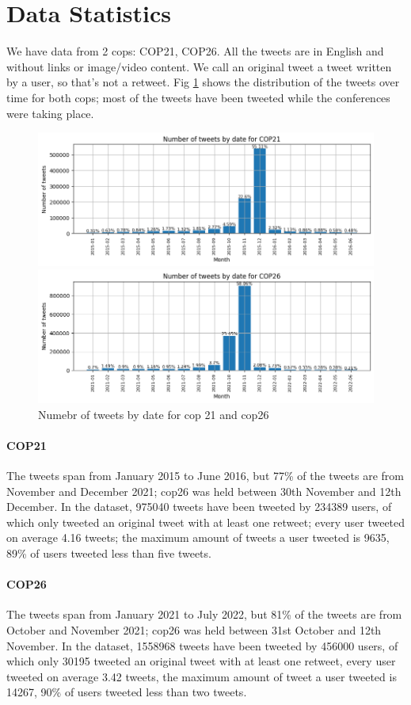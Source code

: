 \section{ Data Statistics}
We have data from 2 cops: COP21, COP26.
All the tweets are in English and without links or image/video content.
We call an original tweet a tweet written by a user, so that's not a retweet. Fig \ref{fig:tweets_by_date} shows the distribution of the tweets over time for both cops; most of the tweets have been tweeted while the conferences were taking place.

\begin{figure}[H]
    \centering
    \includegraphics[width=0.75\linewidth ]{Chapter3/figures/tweets_by_date_cop21.png}

    \includegraphics[width=0.75\linewidth ]{Chapter3/figures/tweets_by_date_cop26.png}
    \caption{Numebr of tweets by date for cop 21 and cop26}
    \label{fig:tweets_by_date}
\end{figure}

\paragraph{COP21}
The tweets span from January 2015 to June 2016, but 77\%  of the tweets are from November and December 2021; cop26 was held between 30th November and 12th December. In the dataset, 975040 tweets have been tweeted by 234389 users, of which only {} tweeted an original tweet with at least one retweet; every user tweeted on average 4.16 tweets; the maximum amount of tweets a user tweeted is 9635, 89\% of users tweeted less than five tweets.

\paragraph{COP26}
The tweets span from January 2021 to July 2022, but 81\%  of the tweets are from October and November 2021; cop26 was held between 31st October and 12th November. In the dataset, 1558968 tweets have been tweeted by 456000 users, of which only 30195 tweeted an original tweet with at least one retweet, every user tweeted on average 3.42 tweets, the maximum amount of tweet a user tweeted is 14267, 90\% of users tweeted less than two tweets.
\\


